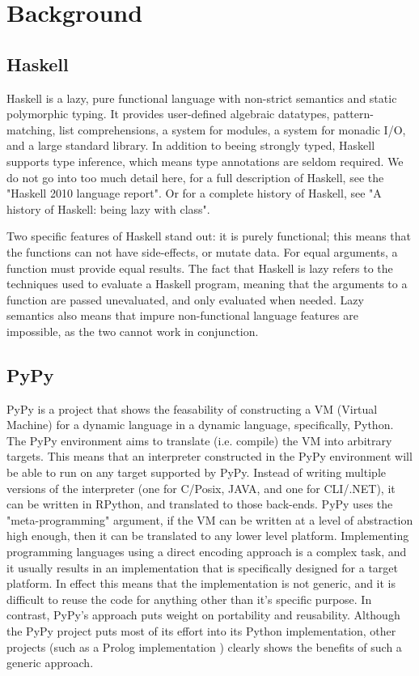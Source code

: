 
\chapter{Background}

\section{Haskell}

Haskell is a lazy, pure functional language with non-strict semantics and static 
polymorphic typing. It provides user-defined algebraic datatypes, pattern-matching, 
list comprehensions, a system for modules, a system for monadic I/O, and a large 
standard library. In addition to beeing strongly typed, Haskell supports type
inference, which means type annotations are seldom required. We do not go into 
too much detail here, for a full description 
of Haskell, see the "Haskell 2010 language report"\cite{marlow2010haskell}. 
Or for a complete history of Haskell, see "A history of Haskell: being lazy 
with class"\cite{hudak2007history}.

Two specific features
of Haskell stand out: it is purely functional; this means that the functions 
can not have side-effects, or mutate data. For equal arguments, a function 
must provide equal results. The fact that Haskell is lazy refers to the techniques
used to evaluate a Haskell program, meaning that the arguments to a function are passed
unevaluated, and only evaluated when needed. Lazy semantics also means that impure 
non-functional language features are impossible, as the two cannot work in conjunction.
\cite{marlow2010haskell, marlow2012glasgow}

\section{PyPy}

PyPy is a project that shows the feasability of constructing a VM (Virtual Machine) 
for a dynamic  language in a dynamic language, specifically, Python. The PyPy 
environment aims to translate (i.e. compile) the VM into arbitrary targets. This 
means that an interpreter constructed in the PyPy environment will be able to 
run on any target supported by PyPy. Instead of writing multiple versions of 
the interpreter (one for C/Posix, JAVA, and one for CLI/.NET), it can be 
written in RPython, and translated to those back-ends. PyPy uses the 
"meta-programming" argument, if the VM can be written at a level of abstraction 
high enough, then it can be translated to any lower level platform. Implementing 
programming languages using a direct encoding approach is a complex task, and it 
usually results in an implementation that is specifically designed for a target platform. 
In effect this means that the implementation is not generic, and it is difficult to 
reuse the code for anything other than it's specific purpose. In contrast, 
PyPy's approach puts weight on portability and reusability\cite{pypy}. Although the
PyPy project puts most of its effort into its Python implementation, other projects
(such as a Prolog implementation \cite{bolz2010towards}) clearly shows the benefits of
such a generic approach.

